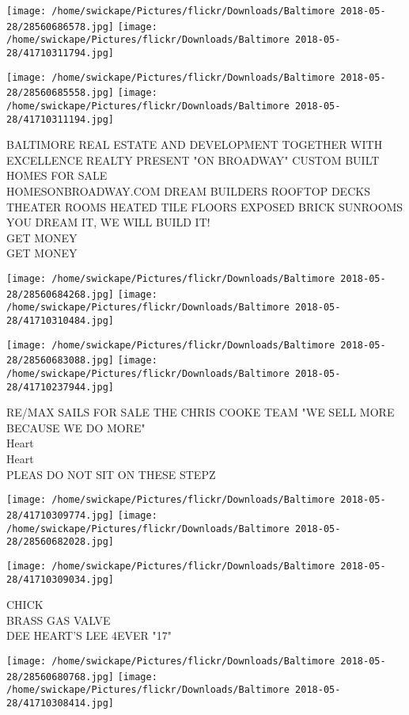 \documentclass[10pt,letterpaper]{article}
\begin{document}
\texttt{[image: /home/swickape/Pictures/flickr/Downloads/Baltimore 2018-05-28/28560686578.jpg]}
\texttt{[image: /home/swickape/Pictures/flickr/Downloads/Baltimore 2018-05-28/41710311794.jpg]}

\texttt{[image: /home/swickape/Pictures/flickr/Downloads/Baltimore 2018-05-28/28560685558.jpg]}
\texttt{[image: /home/swickape/Pictures/flickr/Downloads/Baltimore 2018-05-28/41710311194.jpg]}

BALTIMORE REAL ESTATE AND DEVELOPMENT TOGETHER WITH EXCELLENCE REALTY PRESENT "ON BROADWAY" CUSTOM BUILT HOMES FOR SALE\\
HOMESONBROADWAY.COM DREAM BUILDERS ROOFTOP DECKS THEATER ROOMS HEATED TILE FLOORS EXPOSED BRICK SUNROOMS YOU DREAM IT, WE WILL BUILD IT!\\
GET MONEY\\
GET MONEY\\
\pagebreak

\texttt{[image: /home/swickape/Pictures/flickr/Downloads/Baltimore 2018-05-28/28560684268.jpg]}
\texttt{[image: /home/swickape/Pictures/flickr/Downloads/Baltimore 2018-05-28/41710310484.jpg]}

\texttt{[image: /home/swickape/Pictures/flickr/Downloads/Baltimore 2018-05-28/28560683088.jpg]}
\texttt{[image: /home/swickape/Pictures/flickr/Downloads/Baltimore 2018-05-28/41710237944.jpg]}

RE/MAX SAILS FOR SALE THE CHRIS COOKE TEAM "WE SELL MORE BECAUSE WE DO MORE"\\
Heart\\
Heart\\
PLEAS DO NOT SIT ON THESE STEPZ\\
\pagebreak

\texttt{[image: /home/swickape/Pictures/flickr/Downloads/Baltimore 2018-05-28/41710309774.jpg]}
\texttt{[image: /home/swickape/Pictures/flickr/Downloads/Baltimore 2018-05-28/28560682028.jpg]}

\vspace{0.25in}
\texttt{[image: /home/swickape/Pictures/flickr/Downloads/Baltimore 2018-05-28/41710309034.jpg]}

CHICK\\
BRASS GAS VALVE\\
DEE HEART'S LEE 4EVER "17"\\
\pagebreak

\texttt{[image: /home/swickape/Pictures/flickr/Downloads/Baltimore 2018-05-28/28560680768.jpg]}
\texttt{[image: /home/swickape/Pictures/flickr/Downloads/Baltimore 2018-05-28/41710308414.jpg]}
\end{document}
